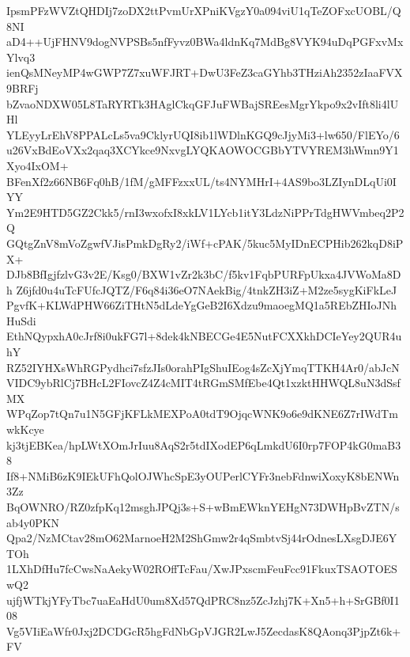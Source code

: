IpsmPFzWVZtQHDIj7zoDX2ttPvmUrXPniKVgzY0a094viU1qTeZOFxcUOBL/Q8NI
aD4++UjFHNV9dogNVPSBs5nfFyvz0BWa4ldnKq7MdBg8VYK94uDqPGFxvMxYlvq3
ienQsMNeyMP4wGWP7Z7xuWFJRT+DwU3FeZ3caGYhb3THziAh2352zIaaFVX9BRFj
bZvaoNDXW05L8TaRYRTk3HAglCkqGFJuFWBajSREesMgrYkpo9x2vIft8li4lUHl
YLEyyLrEhV8PPALcLs5va9CklyrUQI8ib1lWDlnKGQ9cJjyMi3+lw650/FlEYo/6
u26VxBdEoVXx2qaq3XCYkce9NxvgLYQKAOWOCGBbYTVYREM3hWmn9Y1Xyo4IxOM+
BFenXf2z66NB6Fq0hB/1fM/gMFFzxxUL/ts4NYMHrI+4AS9bo3LZIynDLqUi0IYY
Ym2E9HTD5GZ2Ckk5/rnI3wxofxI8xkLV1LYcb1itY3LdzNiPPrTdgHWVmbeq2P2Q
GQtgZnV8mVoZgwfVJisPmkDgRy2/iWf+cPAK/5kuc5MyIDnECPHib262kqD8iPX+
DJb8BfIgjfzlvG3v2E/Ksg0/BXW1vZr2k3bC/f5kv1FqbPURFpUkxa4JVWoMa8Dh
Z6jfd0u4uTcFUfcJQTZ/F6q84i36eO7NAekBig/4tnkZH3iZ+M2ze5sygKiFkLeJ
PgvfK+KLWdPHW66ZiTHtN5dLdeYgGeB2I6Xdzu9maoegMQ1a5REbZHIoJNhHuSdi
EthNQypxhA0cJrf8i0ukFG7l+8dek4kNBECGe4E5NutFCXXkhDCIeYey2QUR4uhY
RZ52IYHXsWhRGPydhci7sfzJIs0orahPIgShuIEog4sZcXjYmqTTKH4Ar0/abJcN
VIDC9ybRlCj7BHcL2FIovcZ4Z4cMIT4tRGmSMfEbe4Qt1xzktHHWQL8uN3dSsfMX
WPqZop7tQn7u1N5GFjKFLkMEXPoA0tdT9OjqcWNK9o6e9dKNE6Z7rIWdTmwkKcye
kj3tjEBKea/hpLWtXOmJrIuu8AqS2r5tdIXodEP6qLmkdU6I0rp7FOP4kG0maB38
If8+NMiB6zK9IEkUFhQolOJWhcSpE3yOUPerlCYFr3nebFdnwiXoxyK8bENWn3Zz
BqOWNRO/RZ0zfpKq12msghJPQj3s+S+wBmEWknYEHgN73DWHpBvZTN/sab4y0PKN
Qpa2/NzMCtav28mO62MarnoeH2M2ShGmw2r4qSmbtvSj44rOdnesLXsgDJE6YTOh
1LXhDfHu7fcCwsNaAekyW02ROffTcFau/XwJPxscmFeuFcc91FkuxTSAOTOESwQ2
ujfjWTkjYFyTbc7uaEaHdU0um8Xd57QdPRC8nz5ZcJzhj7K+Xn5+h+SrGBf0I108
Vg5VIiEaWfr0Jxj2DCDGcR5hgFdNbGpVJGR2LwJ5ZecdasK8QAonq3PjpZt6k+FV
